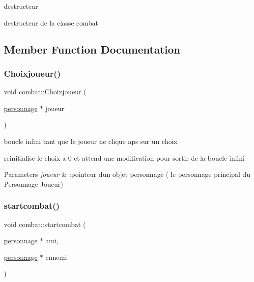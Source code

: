 destructeur 

destructeur de la classe combat 

\subsection{Member Function Documentation}
\mbox{\label{classcombat_afcad4d1096487266fdf07ffd14eb684d}} 
\subsubsection{\texorpdfstring{Choixjoueur()}{Choixjoueur()}}
{\footnotesize\ttfamily void combat\+::\+Choixjoueur (\begin{DoxyParamCaption}\item[{\mbox{\hyperlink{classpersonnage}{personnage}} $\ast$}]{joueur }\end{DoxyParamCaption})\hspace{0.3cm}{\ttfamily [static]}}



boucle infini tant que le joueur ne clique aps sur un choix 

reinitialise le choix a 0 et attend une modification pour sortir de la boucle infini


\begin{DoxyParams}{Parameters}
{\em joueur} & \+:pointeur d\textquotesingle{}un objet personnage ( le personnage principal du Personnage Joueur) \\
\hline
\end{DoxyParams}
\mbox{\label{classcombat_a0d35d19c972a74a3ba97192ab10d2df1}} 
\subsubsection{\texorpdfstring{startcombat()}{startcombat()}}
{\footnotesize\ttfamily void combat\+::startcombat (\begin{DoxyParamCaption}\item[{\mbox{\hyperlink{classpersonnage}{personnage}} $\ast$}]{ami,  }\item[{\mbox{\hyperlink{classpersonnage}{personnage}} $\ast$}]{ennemi }\end{DoxyParamCaption})\hspace{0.3cm}{\ttfamily [static]}}



